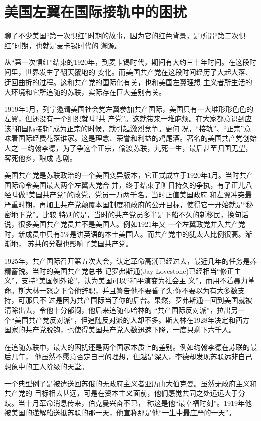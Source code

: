 \documentclass[10pt]{article}
\begin{document}
{\pagebreak
\section{美国左翼在国际接轨中的困扰}

聊了不少美国``第一次惧红''时期的故事，因为它的红色背景，是所谓``第二次惧红''时期，也就是麦卡锡时代的
渊源。

从``第一次惧红''结束的1920年，到麦卡锡时代，期间有大约三十年时间。在这段时间里，世界发生了翻天覆地的
变化。而美国共产党在这段时间经历了大起大落、迂回曲折的过程。这和共产党的国际化有关，也和美国左翼理想
主义者所生活的大环境和它所追随的苏联，实际存在巨大差别有关。

1919年1月，列宁邀请美国社会党左翼参加共产国际，美国只有一大堆形形色色的左翼，但还没有一个组织就叫``共
产党''。这就带来一堆麻烦。在大家都意识到应该``和国际接轨''成为正宗的时候，就引起激烈竞争。更何
况，``接轨''、``正宗''意味着国际经费花落谁家。这是理念、荣誉和利益的鸡尾酒。著名的美国共产党创始人之
一约翰\textperiodcentered 李德，为了争这个正宗，偷渡苏联，九死一生，最后甚至归国无望，客死他乡，酿成
悲剧。

美国共产党是苏联政治的一个美国变异版本，它正式成立于1920年1月。当时共产国际命令美国最大两个左翼大党合
并，终于结束了旷日持久的争执，有了正儿八经叫做``美国共产党''的政党，党员一万两千名。当时正值美国政府
和左翼冲突最严重时期，再加上共产党颠覆本国制度和政府的公开目标，使得它一开始就是``秘密地下党''。比较
特别的是，当时的共产党员多半是下船不久的新移民，换句话说，很多美国共产党员并不是美国人。例如1921年又
一个左翼政党并入共产党时，新成员中只有5\%是讲英语的本土美国人。而共产党中的犹太人比例很高。渐渐地，
苏共的分裂也影响了美国共产党。

1925年，共产国际召开第五次大会，认定革命高潮已经过去，最近几年的任务是养精蓄锐。当时的美国共产党总书
记罗弗斯通(Jay Lovestone)已经相当``修正主义''，支持``美国例外论''，认为美国可以``和平演变为社会主
义''，而用不着暴力革命。斯大林一怒之下令他辞职，并且警告他不要昏了头:你不要以为有大多数支持，可那只不
过是因为共产国际当了你的后台。果然，罗弗斯通一回到美国就被清除出去，令他十分郁闷，他后来追随布哈林的
``共产国际反对派''，拉出另一个``美国共产党反对派''，但追随反对派的人却不多。斯大林在1928年决定和西方
国家的共产党脱钩，也使得美国共产党人数迅速下降，一度只剩下六千人。

在追随苏联中，最大的困扰还是两个国家本质上的差别。例如约翰\textperiodcentered 李德在苏联的最后几年，
他虽然不愿意否定自己的理想，但越是深入，李德却发现苏联远非自己想象中的工人阶级的天堂。

一个典型例子是被遣送回苏俄的无政府主义者亚历山大\textperiodcentered 伯克曼。虽然无政府主义和共产党的
目标相去甚远，可是在资本主义面前，他们感觉共同之处远远大于分歧。当十月革命消息传来，伯克曼兴奋不已，
称这是他``最幸福时刻''。1919年他被美国的递解船送抵苏联的那一天，他宣称那是他``一生中最庄严的一天''。

}
\end{document}
